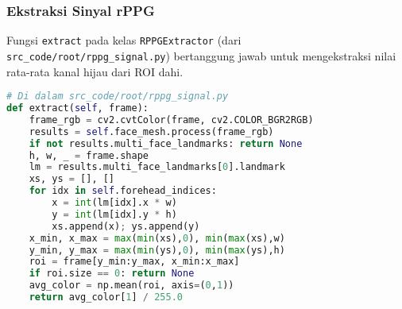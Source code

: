 \documentclass[11pt,a4paper]{article}
\begin{document}
\subsubsection{Ekstraksi Sinyal rPPG}
Fungsi \texttt{extract} pada kelas \texttt{RPPGExtractor} (dari \texttt{src\_code/root/rppg\_signal.py}) bertanggung jawab untuk mengekstraksi nilai rata-rata kanal hijau dari ROI dahi.
\begin{lstlisting}[language=Python, caption=Ekstraksi sinyal rPPG dari file \texttt{src\_code/root/rppg\_signal.py}, label={lst:rppg_extract_new}]
# Di dalam src_code/root/rppg_signal.py
def extract(self, frame):
    frame_rgb = cv2.cvtColor(frame, cv2.COLOR_BGR2RGB)
    results = self.face_mesh.process(frame_rgb)
    if not results.multi_face_landmarks: return None
    h, w, _ = frame.shape
    lm = results.multi_face_landmarks[0].landmark
    xs, ys = [], []
    for idx in self.forehead_indices:
        x = int(lm[idx].x * w)
        y = int(lm[idx].y * h)
        xs.append(x); ys.append(y)
    x_min, x_max = max(min(xs),0), min(max(xs),w)
    y_min, y_max = max(min(ys),0), min(max(ys),h)
    roi = frame[y_min:y_max, x_min:x_max]
    if roi.size == 0: return None
    avg_color = np.mean(roi, axis=(0,1))
    return avg_color[1] / 255.0
\end{lstlisting}
\end{document}
